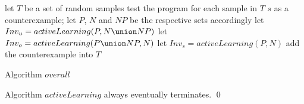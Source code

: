 \begin{algorithm}[t]
\SetAlgoVlined
\Indm
{}
\Indp
let $T$ be a set of random samples\;
 {
    test the program for each sample in $T$\;
     {
        \Return $s$ as a counterexample;
    }
    let $P$, $N$ and $NP$ be the respective sets accordingly\;
    let $Inv_u = activeLearning(P, N \union NP)$\;
    let $Inv_o = activeLearning(P \union NP, N)$\;
    let $Inv_s = activeLearning(P, N)$\;
     {
         {
            add the counterexample into $T$\;
        }
    }
}
\caption{Algorithm $overall$}
\label{alg:overall}
\end{algorithm}

\begin{example}
\end{example}

\begin{proposition}
Algorithm $activeLearning$ always eventually terminates. \hfill \qed
\end{proposition}


\begin{example}
\end{example}